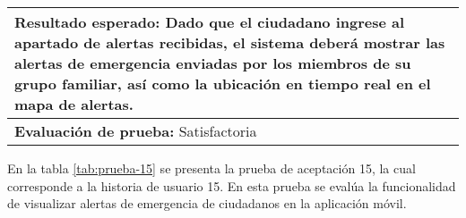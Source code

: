 \begin{longtable}{|p{6.7cm}|p{6.7cm}|}
    \hline
    \multicolumn{2}{|p{13.4cm}|}{\textbf{Resultado esperado:} Dado que el ciudadano ingrese al apartado de alertas recibidas, el sistema deberá mostrar las alertas de emergencia enviadas por los miembros de su grupo familiar, así como la ubicación en tiempo real en el mapa de alertas.} \\
    \hline
    \multicolumn{2}{|p{13.4cm}|}{\textbf{Evaluación de prueba:} Satisfactoria}                                                                                                                                                                                                                 \\
    \hline
\end{longtable}

En la tabla \ref{tab:prueba-15} se presenta la prueba de aceptación 15, la cual corresponde a la historia de usuario 15.
En esta prueba se evalúa la funcionalidad de visualizar alertas de emergencia de ciudadanos en la aplicación móvil.

